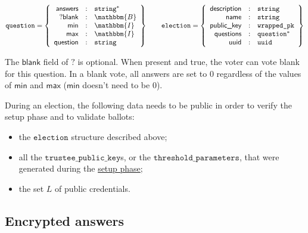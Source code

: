 \documentclass[a4paper]{article}
\newcommand{\I}{\mathbbm{I}}
\newcommand{\B}{\mathbbm{B}}
\newcommand{\jstring}{\texttt{string}}
\newcommand{\tpk}{\texttt{trustee\_public\_key}}
\newcommand{\election}{\texttt{election}}
\begin{document}
\newcommand{\blank}{\textsf{blank}}
\newcommand{\minlabel}{\textsf{min}}
\newcommand{\maxlabel}{\textsf{max}}
\newcommand{\answers}{\textsf{answers}}

\begin{gather*}
  \question=\left\{
    \begin{array}{rcl}
      \answers&:&\jstring^\ast\\
      ?\blank&:&\B\\
      \minlabel&:&\I\\
      \maxlabel&:&\I\\
      \textsf{question}&:&\jstring
    \end{array}
  \right\}
  \qquad
  \election=\left\{
    \begin{array}{rcl}
      \textsf{description}&:&\jstring\\
      \textsf{name}&:&\jstring\\
      \textsf{public\_key}&:&\texttt{wrapped\_pk}\\
      \textsf{questions}&:&\texttt{question}^\ast\\
      \textsf{uuid}&:&\texttt{uuid}
    \end{array}
  \right\}
\end{gather*}

The $\blank$ field of $\question$ is optional. When present and true,
the voter can vote blank for this question. In a blank vote, all
answers are set to $0$ regardless of the values of $\minlabel$ and
$\maxlabel$ ($\minlabel$ doesn't need to be $0$).

\newcommand{\answer}{\texttt{answer}}
\newcommand{\signature}{\texttt{signature}}
\newcommand{\iproofs}{\textsf{individual\_proofs}}
\newcommand{\oproof}{\textsf{overall\_proof}}
\newcommand{\bproof}{\textsf{blank\_proof}}
\newcommand{\choices}{\textsf{choices}}
\newcommand{\iprove}{\textsf{iprove}}

During an election, the following data needs to be public in order to
verify the setup phase and to validate ballots:
\begin{itemize}
\item the $\election$ structure described above;
\item all the $\tpk$s, or the
  $\texttt{threshold\_parameters}$, that were generated during the
  \hyperref[election-setup]{setup phase};
\item the set $L$ of public credentials.
\end{itemize}

\subsection{Encrypted answers}
\label{answers}
\end{document}
